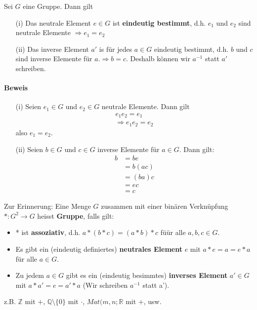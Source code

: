 \documentclass[11pt]{report}
\newcommand*\Zb[1] {\mathbb{#1}}
\newcommand*\f[1] {\textbf{#1}}
\begin{document}
\begin{lemma}
\label{lemma211}
 Sei $G$ eine Gruppe. Dann gilt 
\begin{itemize}
 \item[(i)] Das neutrale Element $e \in G$ ist \f{eindeutig bestimmt}, d.h. $e_1$ und $e_2$ sind neutrale Elemente $\Rightarrow e_1 = e_2$
 \item[(ii)] Das inverse Element $a'$ is für jedes $a\in G$ eindeutig bestimmt, d.h. $b$ und $c$ sind inverse Elemente für $a$.$\Rightarrow b=c$. Deshalb können wir $a^{-1}$ statt $a'$ schreiben.
\end{itemize}
\end{lemma}

\paragraph{Beweis} 
\begin{itemize}
 \item[(i)]
Seien $e_1 \in G$ und $e_2 \in G$ neutrale Elemente. Dann gilt
\begin{align}
  e_1 e_2 = e_1 \\
  \Rightarrow e_1 e_2 = e_2
\end{align}
also $e_1 = e_2$.

\item[(ii)] Seien $b \in G$ und $c \in G$ inverse Elemente für $a \in G$. Dann gilt:
\begin{align}
 b &= be \\
   &= b(ac) \\
   &= (ba)c \\
   &= ec \\
   &= c
\end{align}
\end{itemize}
Zur Erinnerung: Eine Menge $G$ zusammen mit einer binären Verknüpfung $*: G^2 \rightarrow G$ heisst \f{Gruppe}, falls gilt:
\begin{itemize}
 \item * ist \f{assoziativ}, d.h. $a*(b*c) = (a*b)*c$ füür alle $a, b, c \in G$.
 \item Es gibt ein (eindeutig definiertes) \f{neutrales Element} $e$ mit $a*e=a=e*a$ für alle $a \in G$.
 \item Zu jedem $a \in G$ gibt es ein (eindeutig besimmtes) \f{inverses Element} $a' \in G$ mit $a*a'= e = a' * a$ (Wir schreiben $a^{-1}$ statt a').
\end{itemize}

z.B. $\Zb{Z}$ mit $+$, $\Zb{Q}\setminus\{0\}$ mit $\cdot$, $Mat(m, n; \Zb{R}$ mit $+$, usw.
\end{document}
